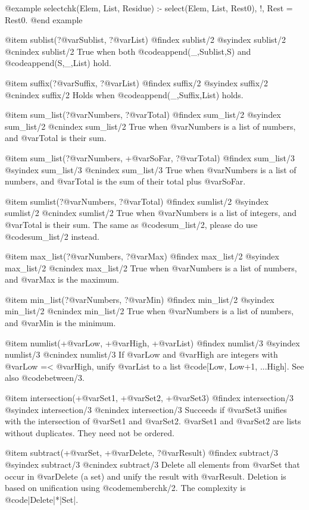 {{{{{{{{{@example
selectchk(Elem, List, Residue) :-
        select(Elem, List, Rest0), !,
        Rest = Rest0.
@end example

 
@item sublist(?@var{Sublist}, ?@var{List})
@findex sublist/2
@syindex sublist/2
@cnindex sublist/2
True when both @code{append(_,Sublist,S)} and @code{append(S,_,List)} hold.
 
@item suffix(?@var{Suffix}, ?@var{List})
@findex suffix/2
@syindex suffix/2
@cnindex suffix/2
Holds when @code{append(_,Suffix,List)} holds.

@item sum_list(?@var{Numbers}, ?@var{Total})
@findex sum_list/2
@syindex sum_list/2
@cnindex sum_list/2
True when @var{Numbers} is a list of numbers, and @var{Total} is their sum.

@item sum_list(?@var{Numbers}, +@var{SoFar}, ?@var{Total})
@findex sum_list/3
@syindex sum_list/3
@cnindex sum_list/3
True when @var{Numbers} is a list of numbers, and @var{Total} is the sum of their total plus @var{SoFar}.

@item sumlist(?@var{Numbers}, ?@var{Total})
@findex sumlist/2
@syindex sumlist/2
@cnindex sumlist/2
True when @var{Numbers} is a list of integers, and @var{Total} is their
sum. The same as @code{sum_list/2}, please do use @code{sum_list/2}
instead.

@item max_list(?@var{Numbers}, ?@var{Max})
@findex max_list/2
@syindex max_list/2
@cnindex max_list/2
True when @var{Numbers} is a list of numbers, and @var{Max} is the maximum.

@item min_list(?@var{Numbers}, ?@var{Min})
@findex min_list/2
@syindex min_list/2
@cnindex min_list/2
True when @var{Numbers} is a list of numbers, and @var{Min} is the minimum.

@item numlist(+@var{Low}, +@var{High}, +@var{List})
@findex numlist/3
@syindex numlist/3
@cnindex numlist/3
If @var{Low} and @var{High} are integers with @var{Low} =<
@var{High}, unify @var{List} to a list @code{[Low, Low+1, ...High]}. See
also @code{between/3}.

@item intersection(+@var{Set1}, +@var{Set2}, +@var{Set3})
@findex intersection/3
@syindex intersection/3
@cnindex intersection/3
Succeeds if @var{Set3} unifies with the intersection of @var{Set1} and
@var{Set2}. @var{Set1} and @var{Set2} are lists without duplicates. They
need not be ordered.

@item subtract(+@var{Set}, +@var{Delete}, ?@var{Result})
@findex subtract/3
@syindex subtract/3
@cnindex subtract/3
Delete all elements from @var{Set} that   occur  in @var{Delete} (a set)
and unify the  result  with  @var{Result}.   Deletion  is  based  on
unification using @code{memberchk/2}. The complexity is
@code{|Delete|*|Set|}.

}}}}}}}}}
